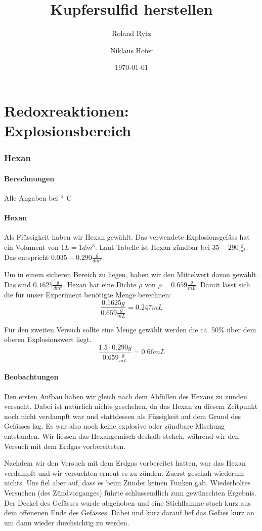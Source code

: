 \documentclass[11pt,paper=a4,final]{scrartcl}
\title{Kupfersulfid herstellen}
\author{Roland Rytz \and Niklaus Hofer}
\date{\today{}}
\begin{document}
\maketitle
\newpage
\tableofcontents
\part{Redoxreaktionen: Explosionsbereich}
\section{Hexan}
\subsection{Berechnungen}
Alle Angaben bei \unit[20]{°C}
\subsection{Hexan}
Als Fl\"ussigkeit haben wir Hexan gew\"ahlt. Das verwendete Explosionsgef\"ass
hat ein Volument von \(1L = 1dm^3\). Laut Tabelle ist Hexan z\"undbar
bei \(35-290 \frac{g}{m^3}\). Das entspricht \(0.035 - 0.290 \frac{g}{dm^3}\).

Um in einem sicheren Bereich zu liegen, haben wir den Mittelwert davon
gew\"ahlt. Das sind \(0.1625 \frac{g}{dm^3}\).
Hexan hat eine Dichte \(\rho\) von \(\rho = 0.659 \frac{g}{mL}\). Damit l\"asst
sich die f\"ur unser Experiment ben\"otigte Menge berechnen:
\[ \frac{0.1625g}{0.659\frac{g}{mL}} = 0.247mL \]

F\"ur den zweiten Versuch sollte eine Menge gew\"ahlt werden die ca. 50\% \"uber
dem oberen Explosionswert liegt. 
\[ \frac{1.5 \cdot 0.290g}{0.659\frac{g}{mL}} = 0.66mL \]

\subsection{Beobachtungen}
Den ersten Aufbau haben wir gleich nach dem Abf\"ullen des Hexans zu z\"unden
versucht. Dabei ist nat\"urlich nichts geschehen, da das Hexan zu diesem
Zeitpunkt noch nicht verdampft war und stattdessen als F\"ussigkeit auf dem
Grund des Gef\"asses lag. Es war also noch keine explosive oder z\"undbare
Mischung entstanden. Wir liessen das Hexangemisch deshalb steheh, w\"ahrend wir
den Versuch mit dem Erdgas vorbereiteten.

Nachdem wir den Versuch mit dem Erdgas vorbereitet hatten, war das Hexan
verdampft und wir versuchten erneut es zu z\"unden. Zuerst geschah wiederum
nichts. Uns fiel aber auf, dass es beim Z\"under keinen Funken gab. Wiederholtes
Versuchen (des Z\"undvorganges) f\"uhrte schlussendlich zum gew\"unschten
Ergebnis. Der Deckel des Gef\"asses wurde abgehoben und eine Stichflamme stach
kurz aus dem offenenen Ende des Gef\"asses. Dabei und kurz darauf lief das
Gef\"ass kurz an um dann wieder durchsichtig zu werden.
\end{document}
